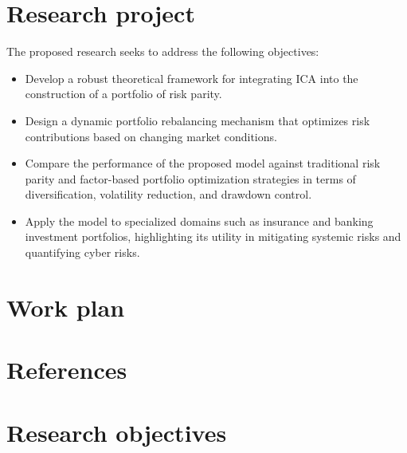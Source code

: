 \documentclass{article}
\begin{document}
\section*{Research project}
The proposed research seeks to address the following objectives:
\begin{itemize}
    \item Develop a robust theoretical framework for integrating ICA into the construction of a portfolio of risk parity.
    \item Design a dynamic portfolio rebalancing mechanism that optimizes risk contributions based on changing market conditions.
    \item Compare the performance of the proposed model against traditional risk parity and factor-based portfolio optimization strategies in terms of diversification, volatility reduction, and drawdown control.
    \item Apply the model to specialized domains such as insurance and banking investment portfolios, highlighting its utility in mitigating systemic risks and quantifying cyber risks.
\end{itemize}
\section*{Work plan}
\section*{References}
\section*{Research objectives}
\end{document}
